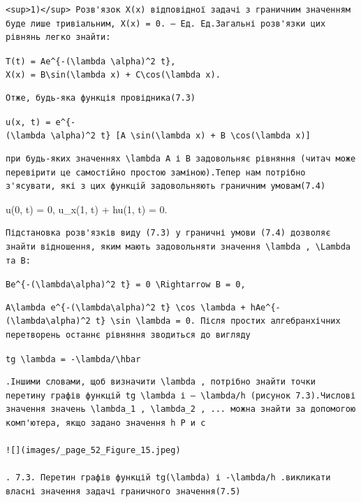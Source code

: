 \documentclass[
  ukrainian,
]{article}
\begin{document}
\begin{verbatim}
<sup>1)</sup> Розв'язок X(x) відповідної задачі з граничним значенням буде лише тривіальним, X(x) = 0. — Ед. Ед.Загальні розв'язки цих рівнянь легко знайти:
\end{verbatim}

\texttt{T(t)\ =\ Ae\^{}\{-(\textbackslash{}lambda\ \textbackslash{}alpha)\^{}2\ t\},}
\texttt{X(x)\ =\ B\textbackslash{}sin(\textbackslash{}lambda\ x)\ +\ C\textbackslash{}cos(\textbackslash{}lambda\ x).}

\begin{verbatim}
Отже, будь-яка функція провідника(7.3)
\end{verbatim}

\texttt{u(x,\ t)\ =\ e\^{}\{-(\textbackslash{}lambda\ \textbackslash{}alpha)\^{}2\ t\}\ {[}A\ \textbackslash{}sin(\textbackslash{}lambda\ x)\ +\ B\ \textbackslash{}cos(\textbackslash{}lambda\ x){]}}

\begin{verbatim}
при будь-яких значеннях \lambda A і B задовольняє рівняння (читач може перевірити це самостійно простою заміною).Тепер нам потрібно з'ясувати, які з цих функцій задовольняють граничним умовам(7.4)
\end{verbatim}

u(0, t) = 0, u\_x(1, t) + hu(1, t) = 0.

\begin{verbatim}
Підстановка розв'язків виду (7.3) у граничні умови (7.4) дозволяє знайти відношення, яким мають задовольняти значення \lambda , \Lambda та B:
\end{verbatim}

\texttt{Be\^{}\{-(\textbackslash{}lambda\textbackslash{}alpha)\^{}2\ t\}\ =\ 0\ \textbackslash{}Rightarrow\ B\ =\ 0,}

\begin{verbatim}
A\lambda e^{-(\lambda\alpha)^2 t} \cos \lambda + hAe^{-(\lambda\alpha)^2 t} \sin \lambda = 0. Після простих алгебранхічних перетворень останнє рівняння зводиться до вигляду
\end{verbatim}

\texttt{tg\ \textbackslash{}lambda\ =\ -\textbackslash{}lambda/\textbackslash{}hbar}

\begin{verbatim}
.Іншими словами, щоб визначити \lambda , потрібно знайти точки перетину графів функцій tg \lambda і — \lambda/h (рисунок 7.3).Числові значення значень \lambda_1 , \lambda_2 , ... можна знайти за допомогою комп'ютера, якщо задано значення h Р и с

![](images/_page_52_Figure_15.jpeg)

. 7.3. Перетин графів функцій tg(\lambda) і -\lambda/h .викликати власні значення задачі граничного значення(7.5)
\end{verbatim}
\end{document}
